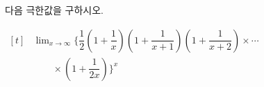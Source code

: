 다음 극한값을 구하시오. \par\smallskip\noindent\hspace*{1.5em}$\begin{aligned}[t] &\lim_{x\to\infty}\biggl\{\dfrac{1}{2}\left(1+\dfrac{1}{x}\right)\left(1+\dfrac{1}{x+1}\right)\left(1+\dfrac{1}{x+2}\right)\times\cdots\\ &\qquad\times\left(1+\dfrac{1}{2x}\right)\biggr\}^x \end{aligned}$
